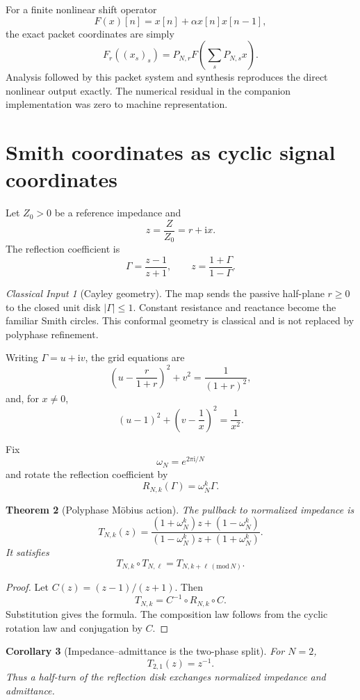 \documentclass[11pt]{article}
\newtheorem{theorem}{Theorem}[section]
\newtheorem{corollary}[theorem]{Corollary}
\theoremstyle{definition}
\theoremstyle{remark}
\newtheorem{classical}[theorem]{Classical Input}
\newcommand{\Gam}{\Gamma}
\newcommand{\ii}{\mathrm i}
\begin{document}
For a finite nonlinear shift operator
\[
F(x)[n]=x[n]+\alpha x[n]x[n-1],
\]
the exact packet coordinates are simply
\[
F_r((x_s)_s)=P_{N,r}F\!\left(\sum_sP_{N,s}x\right).
\]
Analysis followed by this packet system and synthesis reproduces the direct nonlinear output exactly. The numerical residual in the companion implementation was zero to machine representation.

\section{Smith coordinates as cyclic signal coordinates}

Let $Z_0>0$ be a reference impedance and
\[
z=\frac{Z}{Z_0}=r+\ii x.
\]
The reflection coefficient is
\[
\boxed{
\Gam=\frac{z-1}{z+1},
\qquad
z=\frac{1+\Gam}{1-\Gam}.
}
\]

\begin{classical}[Cayley geometry]
The map sends the passive half-plane $r\ge0$ to the closed unit disk $|\Gam|\le1$. Constant resistance and reactance become the familiar Smith circles. This conformal geometry is classical and is not replaced by polyphase refinement.
\end{classical}

Writing $\Gam=u+\ii v$, the grid equations are
\[
\left(u-\frac{r}{1+r}\right)^2+v^2=\frac1{(1+r)^2},
\]
and, for $x\ne0$,
\[
(u-1)^2+\left(v-\frac1x\right)^2=\frac1{x^2}.
\]

Fix
\[
\omega_N=e^{2\pi\ii/N}
\]
and rotate the reflection coefficient by
\[
R_{N,k}(\Gam)=\omega_N^k\Gam.
\]

\begin{theorem}[Polyphase M\"obius action]
The pullback to normalized impedance is
\[
\boxed{
T_{N,k}(z)
=
\frac{(1+\omega_N^k)z+(1-\omega_N^k)}
{(1-\omega_N^k)z+(1+\omega_N^k)}.
}
\]
It satisfies
\[
T_{N,k}\circ T_{N,\ell}=T_{N,k+\ell\, (\mathrm{mod}\,N)}.
\]
\end{theorem}

\begin{proof}
Let $C(z)=(z-1)/(z+1)$. Then
\[
T_{N,k}=C^{-1}\circ R_{N,k}\circ C.
\]
Substitution gives the formula. The composition law follows from the cyclic rotation law and conjugation by $C$.
\end{proof}

\begin{corollary}[Impedance--admittance is the two-phase split]
For $N=2$,
\[
\boxed{T_{2,1}(z)=z^{-1}.}
\]
Thus a half-turn of the reflection disk exchanges normalized impedance and admittance.
\end{corollary}
\end{document}
